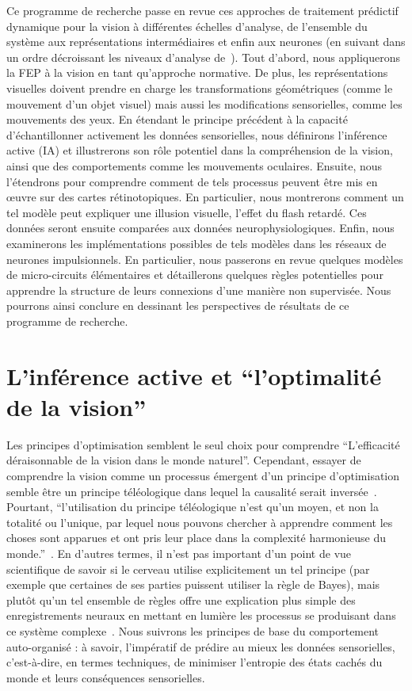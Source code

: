 Ce programme de recherche passe en revue ces approches de traitement prédictif
dynamique pour la vision à différentes échelles d'analyse, de l'ensemble
du système aux représentations intermédiaires et enfin aux neurones (en
suivant dans un ordre décroissant les niveaux d'analyse de~\citet{Marr83}).
Tout d'abord, nous appliquerons la FEP à la vision en tant qu'approche
normative. De plus, les représentations visuelles doivent prendre en
charge les transformations géométriques (comme le mouvement d'un objet
visuel) mais aussi les modifications sensorielles, comme les mouvements
des yeux. En étendant le principe précédent à la capacité
d'échantillonner activement les données sensorielles, nous définirons
l'inférence active (IA) et illustrerons son rôle potentiel dans la
compréhension de la vision, ainsi que des comportements comme les
mouvements oculaires. Ensuite, nous l'étendrons pour
comprendre comment de tels processus peuvent être mis en œuvre sur des
cartes rétinotopiques. En particulier, nous montrerons
comment un tel modèle peut expliquer une illusion visuelle, l'effet du flash retardé. %
Ces données seront ensuite comparées aux données
neurophysiologiques. Enfin, nous examinerons les implémentations
possibles de tels modèles dans les réseaux de neurones impulsionnels. En particulier, nous passerons en revue quelques modèles de
micro-circuits élémentaires et détaillerons quelques règles potentielles
pour apprendre la structure de leurs connexions d'une manière non
supervisée. Nous pourrons ainsi conclure en dessinant les perspectives de résultats de ce programme de recherche.

\section{L'inférence active et ``l'optimalité de la vision''}
\label{sec:ai}
Les principes d'optimisation semblent le seul choix pour comprendre
``L'efficacité déraisonnable de la vision dans le monde naturel''.
Cependant, essayer de comprendre la vision comme un processus émergent
d'un principe d'optimisation semble être un principe téléologique dans
lequel la causalité serait inversée~\citep{Turkheimer19}. Pourtant,
``l'utilisation du principe téléologique n'est qu'un moyen, et non la
totalité ou l'unique, par lequel nous pouvons chercher à apprendre
comment les choses sont apparues et ont pris leur place dans la
complexité harmonieuse du monde.''~\citep[chap. 1, ma traduction]{DArcy-Thompson17}. En
d'autres termes, il n'est pas important d'un point de vue scientifique
de savoir si le cerveau utilise explicitement un tel principe (par
exemple que certaines de ses parties puissent utiliser la règle de
Bayes), mais plutôt qu'un tel ensemble de règles offre une explication
plus simple des enregistrements neuraux en mettant en lumière les
processus se produisant dans ce système complexe~\citep{Varoquaux19}.
Nous suivrons les principes de base du comportement auto-organisé
: à savoir, l'impératif de prédire au mieux les données sensorielles,
c'est-à-dire, en termes techniques, de minimiser l'entropie des états
cachés du monde et leurs conséquences sensorielles.

